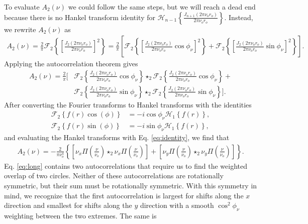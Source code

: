 \documentclass{osa-article}
\begin{document}
 To evaluate $A_2(\nu)$ we could follow the same steps, but we will reach a dead
 end because there is no Hankel transform identity for
 $\mathcal{H}_{n-1}\left\{\frac{J_{n+1}(2\pi\nu_o r_o)}{2\pi\nu_o r_o}\right\}$.
 Instead, we rewrite $A_2(\nu)$ as
\begin{align}
  A_2(\nu) = \frac{2}{\pi}\mathcal{F}_2\left\{\left[\frac{J_2(2\pi\nu_o r_o)}{2\pi\nu_o r_o}\right]^2\right\} = \frac{2}{\pi}\left[\mathcal{F}_2\left\{\left[\frac{J_2(2\pi\nu_o r_o)}{2\pi\nu_o r_o}\cos\phi_{\nu}\right]^2\right\} + \mathcal{F}_2\left\{\left[\frac{J_2(2\pi\nu_o r_o)}{2\pi\nu_o r_o}\sin\phi_{\nu}\right]^2\right\}\right].
\end{align}
Applying the autocorrelation theorem gives
\begin{align}
  A_2(\nu) = \frac{2}{\pi}\Bigg[&\mathcal{F}_2\left\{\frac{J_2(2\pi\nu_o r_o)}{2\pi\nu_o r_o}\cos\phi_{\nu}\right\} \star_2 \mathcal{F}_2\left\{\frac{J_2(2\pi\nu_o r_o)}{2\pi\nu_o r_o}\cos\phi_{\nu}\right\} + \nonumber\\ &\mathcal{F}_2\left\{\frac{J_2(2\pi\nu_o r_o)}{2\pi\nu_o r_o}\sin\phi_{\nu}\right\} \star_2 \mathcal{F}_2\left\{\frac{J_2(2\pi\nu_o r_o)}{2\pi\nu_o r_o}\sin\phi_{\nu}\right\}\Bigg].
\end{align}
After converting the Fourier transforms to Hankel transforms with the identities
\begin{align}
  \mathcal{F}_2\left\{f(r)\cos(\phi)\right\} &= -i\cos\phi_{\nu}\mathcal{H}_1\left\{f(r)\right\},\\
  \mathcal{F}_2\left\{f(r)\sin(\phi)\right\} &= -i\sin\phi_{\nu}\mathcal{H}_1\left\{f(r)\right\},
\end{align}
and evaluating the Hankel transforms with Eq. \ref{eq:identity}, we find that
\begin{align}
  A_2(\nu) = -\frac{2}{\pi\nu_o^4}\left\{\left[\nu_x\Pi\left(\frac{\nu}{\nu_o}\right) \star_2 \nu_x\Pi\left(\frac{\nu}{\nu_o}\right)\right] + \left[\nu_y\Pi\left(\frac{\nu}{\nu_o}\right) \star_2 \nu_y\Pi\left(\frac{\nu}{\nu_o}\right)\right]\right\}. \label{eq:long}
\end{align}
Eq. \ref{eq:long} contains two autocorrelations that require us to find the
weighted overlap of two circles. Neither of these autocorrelations are
rotationally symmetric, but their sum must be rotationally symmetric. With this
symmetry in mind, we recognize that the first autocorrelation is largest for
shifts along the $x$ direction and smallest for shifts along the $y$ direction
with a smooth $\cos^2\phi_{\nu}$ weighting between the two extremes. The same is
\end{document}
